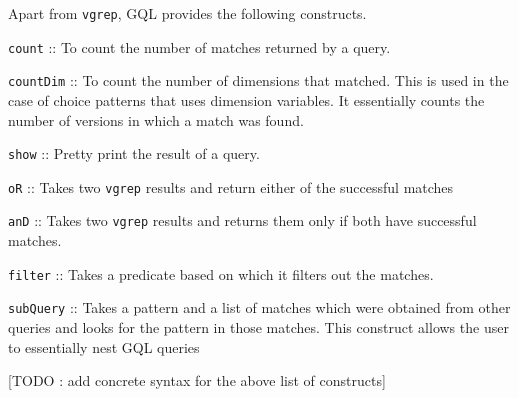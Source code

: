 Apart from \texttt{vgrep}, GQL provides the following constructs.
\begin{description}
\item \texttt{count} :: To count the number of matches returned by a query.
\item \texttt{countDim} :: To count the number of dimensions that matched. This is used in the case of choice patterns that uses dimension variables. It essentially counts the number of versions in which a match was found.
\item \texttt{show} :: Pretty print the result of a query.
\item \texttt{oR} :: Takes two \texttt{vgrep} results and return either of the successful matches
\item \texttt{anD} :: Takes two \texttt{vgrep} results and returns them only if both have successful matches.
\item \texttt{filter} :: Takes a predicate based on which it filters out the matches. %
\item \texttt{subQuery} :: Takes a pattern and a list of matches which were obtained from other queries and looks for the pattern in those matches. This construct allows the user to essentially nest GQL queries
\end{description}
[TODO : add concrete syntax for the above list of constructs]



